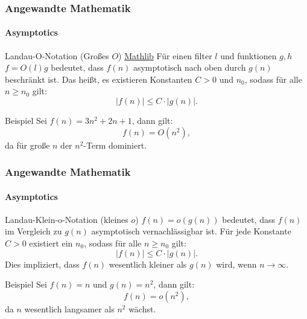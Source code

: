 \documentclass{beamer}
\begin{document}
\begin{frame}
    \frametitle{Angewandte Mathematik}
    \framesubtitle{Asymptotics}
    \begin{block}{Landau-O-Notation (Großes \( O \)) \href{https://github.com/leanprover-community/mathlib4/blob/418a5eb7aec3fb639097cb13f74fc031ac4057f2/Mathlib/Analysis/Asymptotics/Asymptotics.lean\#L75-L80}{Mathlib}
        }
        Für einen filter $l$ und funktionen $g,h$
    \( f  = O(l) g \) bedeutet, dass \( f(n) \) asymptotisch nach oben durch \( g(n) \) beschränkt ist. 
    Das heißt, es existieren Konstanten \( C > 0 \) und \( n_0 \), sodass für alle \( n \geq n_0 \) gilt:
    \[
    |f(n)| \leq C \cdot |g(n)|.
    \]
    \end{block}

    \begin{exampleblock}{Beispiel} 
    Sei \( f(n) = 3n^2 + 2n + 1 \), dann gilt:
    \[
    f(n) = O(n^2),
    \]
    da für große \( n \) der \( n^2 \)-Term dominiert.
    \end{exampleblock}
\end{frame}

\begin{frame}
    \frametitle{Angewandte Mathematik}
    \framesubtitle{Asymptotics}
    
    \begin{block}{Landau-Klein-o-Notation (kleines \( o \))}
        \( f(n) = o(g(n)) \) bedeutet, dass \( f(n) \) im Vergleich zu \( g(n) \) asymptotisch vernachlässigbar ist. Für jede Konstante \( C > 0 \) existiert ein \( n_0 \), sodass für alle \( n \geq n_0 \) gilt:
        \[
        |f(n)| \leq C \cdot |g(n)|.
        \]
        Dies impliziert, dass \( f(n) \) wesentlich kleiner als \( g(n) \) wird, wenn \( n \to \infty \).
    \end{block}

    \begin{exampleblock}{Beispiel}
        Sei \( f(n) = n \) und \( g(n) = n^2 \), dann gilt:
        \[
        f(n) = o(n^2),
        \]
        da \( n \) wesentlich langsamer als \( n^2 \) wächst.
    \end{exampleblock}
\end{frame}
\end{document}
